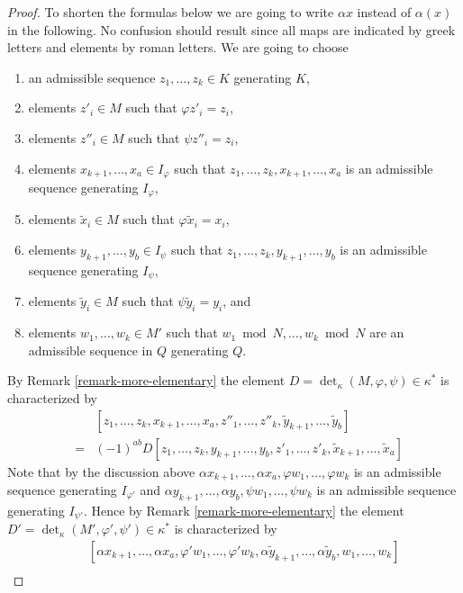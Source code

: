 \begin{proof}
\medskip\noindent
To shorten the formulas below we are going to write $\alpha x$ instead
of $\alpha(x)$ in the following. No confusion should result since
all maps are indicated by greek letters and elements by roman letters.
We are going to choose
\begin{enumerate}
\item an admissible sequence $z_1, \ldots, z_k \in K$
generating $K$,
\item elements $z'_i \in M$ such that $\varphi z'_i = z_i$,
\item elements $z''_i \in M$ such that $\psi z''_i = z_i$,
\item elements $x_{k + 1}, \ldots, x_a \in I_\varphi$ such
that $z_1, \ldots, z_k, x_{k + 1}, \ldots, x_a$ is an admissible
sequence generating $I_\varphi$,
\item elements $\tilde x_i \in M$ such that $\varphi \tilde x_i = x_i$,
\item elements $y_{k + 1}, \ldots, y_b \in I_\psi$ such that
$z_1, \ldots, z_k, y_{k + 1}, \ldots, y_b$ is an admissible
sequence generating $I_\psi$,
\item elements $\tilde y_i \in M$ such that $\psi \tilde y_i = y_i$, and
\item elements $w_1, \ldots, w_k \in M'$ such that
$w_1 \bmod N, \ldots, w_k \bmod N$ are an admissible sequence
in $Q$ generating $Q$.
\end{enumerate}
By Remark \ref{remark-more-elementary} the element
$D = \det_\kappa(M, \varphi, \psi) \in \kappa^*$ is
characterized by
\begin{eqnarray*}
& &
[z_1, \ldots, z_k,
x_{k + 1}, \ldots, x_a,
z''_1, \ldots, z''_k,
\tilde y_{k + 1}, \ldots, \tilde y_b] \\
& = &
(-1)^{ab} D
[z_1, \ldots, z_k,
y_{k + 1}, \ldots, y_b,
z'_1, \ldots, z'_k,
\tilde x_{k + 1}, \ldots, \tilde x_a]
\end{eqnarray*}
Note that by the discussion above
$\alpha x_{k + 1}, \ldots, \alpha x_a, \varphi w_1, \ldots, \varphi w_k$
is an admissible sequence generating $I_{\varphi'}$ and
$\alpha y_{k + 1}, \ldots, \alpha y_b, \psi w_1, \ldots, \psi w_k$
is an admissible sequence generating $I_{\psi'}$.
Hence by Remark \ref{remark-more-elementary} the element
$D' = \det_\kappa(M', \varphi', \psi') \in \kappa^*$ is
characterized by
\begin{eqnarray*}
& &
[\alpha x_{k + 1}, \ldots, \alpha x_a,
\varphi' w_1, \ldots, \varphi' w_k,
\alpha \tilde y_{k + 1}, \ldots, \alpha \tilde y_b,
w_1, \ldots, w_k]
\\

\end{eqnarray*}
\end{proof}
